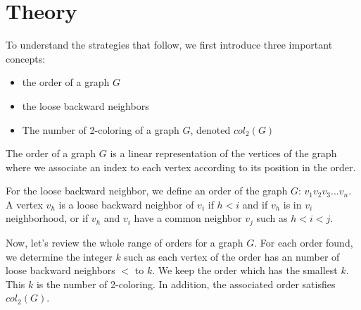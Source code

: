 \chapter{Theory}

To understand the strategies that follow, we first introduce three important concepts:
\begin{itemize}
\item the order of a graph $G$
\item the loose backward neighbors
\item The number of 2-coloring of a graph $G$, denoted $col_{2}(G)$
\end{itemize}

The order of a graph $G$ is a linear representation of the vertices of the graph where we associate an index to each vertex according to its position in the order.

For the loose backward neighbor, we define an order of the graph $G$: $v_{1} v_{2} v_{3}... v_{n}$. A vertex $v_{h}$ is a loose backward neighbor of $v_{i}$ if $h < i$ and if $v_{h}$ is in $v_{i}$ neighborhood, or if $v_{h}$ and $v_{i}$ have a common neighbor $v_{j}$ such as $ h < i < j$.

Now, let's review the whole range of orders for a graph $G$. For each order found, we determine the integer $k$ such as each vertex of the order has an number of loose backward neighbors $<$ to $k$. We keep the order which has the smallest $k$. This $k$ is the number of 2-coloring. In addition, the associated order satisfies $col_{2}(G)$.

%
%
%
%
